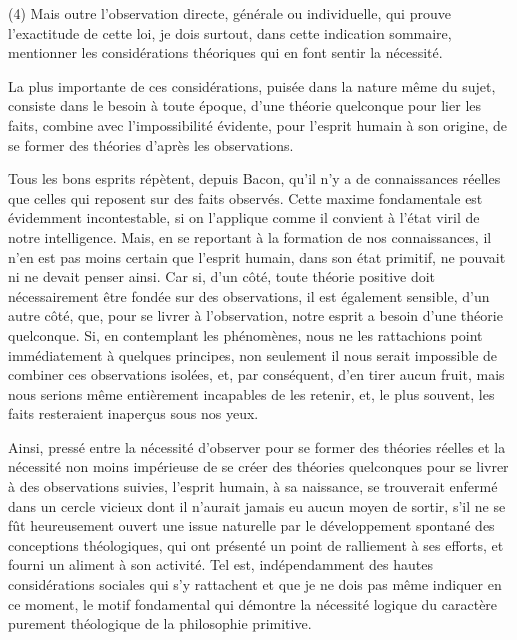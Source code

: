 \documentclass[french,twoside]{book} %
\begin{document}
(4) Mais outre l’observation directe, générale ou individuelle, qui prouve l’exactitude de cette loi, je dois surtout, dans cette indication sommaire, mentionner les considérations théoriques qui en font sentir la nécessité.\par
La plus importante de ces considérations, puisée dans la nature même du sujet, consiste dans le besoin à toute époque, d’une théorie quelconque pour lier les faits, combine avec l’impossibilité évidente, pour l’esprit humain à son origine, de se former des théories d’après les observations.\par
Tous les bons esprits répètent, depuis Bacon, qu’il n’y a de connaissances réelles que celles qui reposent sur des faits observés. Cette maxime fondamentale est évidemment incontestable, si on l’applique comme il convient à l’état viril de notre intelligence. Mais, en se reportant à la formation de nos connaissances, il n’en est pas moins certain que l’esprit humain, dans son état primitif, ne pouvait ni ne devait penser ainsi. Car si, d’un côté, toute théorie positive doit nécessairement être fondée sur des observations, il est également sensible, d’un autre côté, que, pour se livrer à l’observation, notre esprit a besoin d’une théorie quelconque. Si, en contemplant les phénomènes, nous ne les rattachions point immédiatement à quelques principes, non seulement il nous serait impossible de combiner ces observations isolées, et, par conséquent, d’en tirer aucun fruit, mais nous serions même entièrement incapables de les retenir, et, le plus souvent, les faits resteraient inaperçus sous nos yeux.\par
Ainsi, pressé entre la nécessité d’observer pour se former des théories réelles et la nécessité non moins impérieuse de se créer des théories quelconques pour se livrer à des observations suivies, l’esprit humain, à sa naissance, se trouverait enfermé dans un cercle vicieux dont il n’aurait jamais eu aucun moyen de sortir, s’il ne se fût heureusement ouvert une issue naturelle par le développement spontané des conceptions théologiques, qui ont présenté un point de ralliement à ses efforts, et fourni un aliment à son activité. Tel est, indépendamment des hautes considérations sociales qui s’y rattachent et que je ne dois pas même indiquer en ce moment, le motif fondamental qui démontre la nécessité logique du caractère purement théologique de la philosophie primitive.\par
\end{document}
